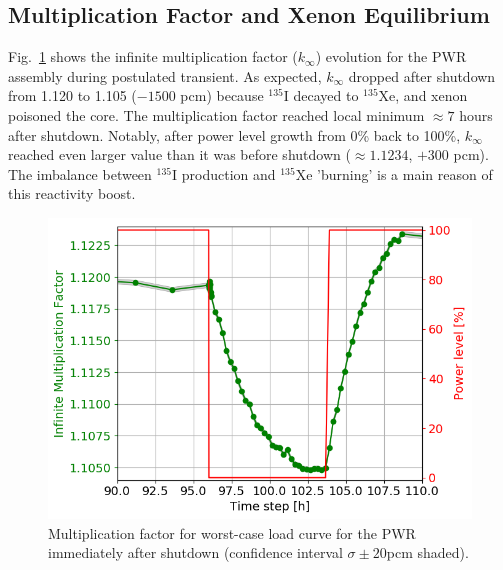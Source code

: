 \documentclass{anstrans}
\begin{document}
\subsection{Multiplication Factor and Xenon Equilibrium}
Fig.~\ref{fig:pwr_keff} shows the infinite multiplication factor 
($k_{\infty}$) evolution for the \gls{PWR} assembly during postulated 
transient. As expected, $k_{\infty}$ dropped  after shutdown from 1.120 to 
1.105 ($-1500$ pcm) because $^{135}$I decayed to $^{135}$Xe, and xenon 
poisoned the core. The multiplication factor reached local minimum  
$\approx7$ hours after shutdown. Notably, after power level growth from 
0\% back to 100\%, 
$k_{\infty}$ reached even larger value than it was before shutdown ($\approx 
1.1234$, $+300$ pcm). The imbalance between $^{135}$I production and 
$^{135}$Xe 'burning' is a main reason of this reactivity boost.
\begin{figure}[htbp!] %
	\centering
	\includegraphics[width=1.03\linewidth]{pwr_keff_zoomed.png}
		\vspace{-0.25in}
	\caption{Multiplication factor for worst-case load curve for the \gls{PWR} 
	immediately after shutdown (confidence interval $\sigma\pm20$pcm shaded).}
		\vspace{-0.05in}
	\label{fig:pwr_keff}
\end{figure}
\end{document}
